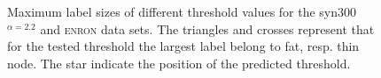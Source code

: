 \begin{figure}[!ht]
\centering
{}\hspace*{-2.5em}
%
\caption{Maximum label sizes of different threshold values for the   syn300$^{\alpha=2.2}$ and \textsc{enron} data sets.
The triangles and crosses represent that for the tested threshold the largest label belong to fat, resp. thin node. The star indicate the position of the predicted threshold.}
\label{fig:findings}%
\end{figure}

